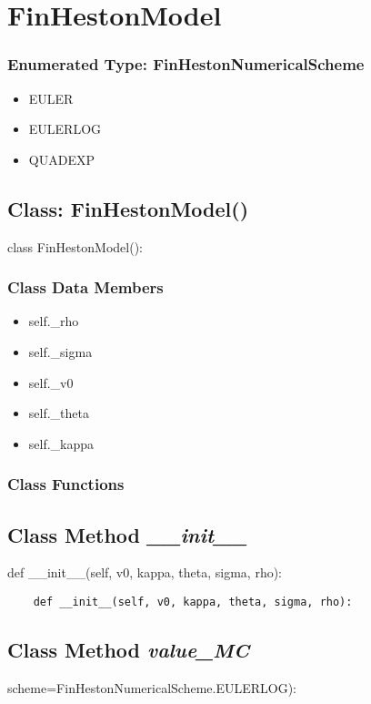 \documentclass[twoside,11pt]{book}
\begin{document}
\newpage
\section{FinHestonModel}

\subsubsection{Enumerated Type: FinHestonNumericalScheme}
\begin{itemize}
\item{EULER}
\item{EULERLOG}
\item{QUADEXP}
\end{itemize}

\subsection{Class: FinHestonModel()}
class FinHestonModel():

\subsubsection{Class Data Members}
\begin{itemize}
\item{self.\_rho}
\item{self.\_sigma}
\item{self.\_v0}
\item{self.\_theta}
\item{self.\_kappa}
\end{itemize}

\subsubsection{Class Functions}

\subsection{Class Method {\it \_\_init\_\_}}
def \_\_init\_\_(self, v0, kappa, theta, sigma, rho):

\begin{lstlisting}
    def __init__(self, v0, kappa, theta, sigma, rho):
\end{lstlisting}

\subsection{Class Method {\it value\_MC}}
scheme=FinHestonNumericalScheme.EULERLOG):
\end{document}
